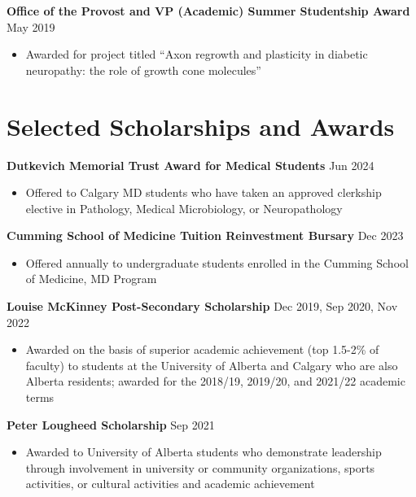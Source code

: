 \documentclass{article}
\begin{document}
\textbf{Office of the Provost and VP (Academic) Summer Studentship Award} \hfill May 2019
\begin{itemize}
    \item Awarded for project titled ``Axon regrowth and plasticity in diabetic neuropathy: the role of growth cone molecules''
\end{itemize}


\section*{\textcolor{my_colour}{Selected Scholarships and Awards} }
\vspace{-.25em} \hrulefill \vspace{.25em}

\textbf{Dutkevich Memorial Trust Award for Medical Students} \hfill Jun 2024
\begin{itemize}
    \item Offered to Calgary MD students who have taken an  approved clerkship elective in Pathology, Medical Microbiology, or Neuropathology
\end{itemize} \vspace{1em}

\textbf{Cumming School of Medicine Tuition Reinvestment Bursary} \hfill Dec 2023
\begin{itemize}
    \item Offered annually to undergraduate students enrolled in the Cumming School of Medicine, MD Program
\end{itemize} \vspace{1em}

\textbf{Louise McKinney Post-Secondary Scholarship} \hfill Dec 2019, Sep 2020, Nov 2022
\begin{itemize}
    \item Awarded on the basis of superior academic achievement (top 1.5-2\% of faculty) to students at the University of Alberta and Calgary who are also Alberta residents; awarded for the 2018/19, 2019/20, and 2021/22 academic terms
\end{itemize} \vspace{1em}

\textbf{Peter Lougheed Scholarship} \hfill Sep 2021
\begin{itemize}
    \item Awarded to University of Alberta students who demonstrate leadership through involvement in university or community organizations, sports activities, or cultural activities and academic achievement
\end{itemize} \vspace{1em}
\end{document}
